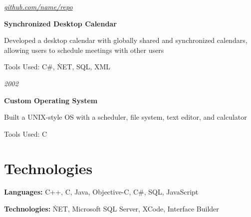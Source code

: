         \vspace{0.2 cm}

        \begin{twocolentry}{
            
            
        \textit{\href{https://github.com/sinaatalay/rendercv}{github.com/name/repo}}}
            \textbf{Synchronized Desktop Calendar}
        \end{twocolentry}

        \vspace{0.10 cm}
        \begin{onecolentry}
            \begin{highlights}
                \item Developed a desktop calendar with globally shared and synchronized calendars, allowing users to schedule meetings with other users
                \item Tools Used: C\#, \.NET, SQL, XML
            \end{highlights}
        \end{onecolentry}


        \vspace{0.2 cm}

        \begin{twocolentry}{
            
            
        \textit{2002}}
            \textbf{Custom Operating System}
        \end{twocolentry}

        \vspace{0.10 cm}
        \begin{onecolentry}
            \begin{highlights}
                \item Built a UNIX-style OS with a scheduler, file system, text editor, and calculator
                \item Tools Used: C
            \end{highlights}
        \end{onecolentry}



    
    \section{Technologies}



        
        \begin{onecolentry}
            \textbf{Languages:} C++, C, Java, Objective-C, C\#, SQL, JavaScript
        \end{onecolentry}

        \vspace{0.2 cm}

        \begin{onecolentry}
            \textbf{Technologies:} \.NET, Microsoft SQL Server, XCode, Interface Builder
        \end{onecolentry}


    


